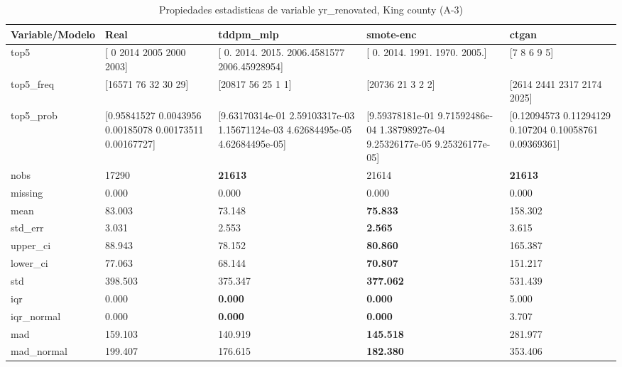 \begin{table}[H]
\centering
\fontsize{8}{14}\selectfont
\caption{Propiedades  estadisticas de variable yr\_renovated, King county (A-3)}
\label{table-stats-king county-a-3-yr_renovated}
\begin{tabular}{|l|m{10em}|m{10em}|m{10em}|m{10em}|}
\hline
 \rowcolor[gray]{0.8}
Variable/Modelo & Real & tddpm\_mlp & smote-enc & ctgan \\
\hline top5 & [   0 2014 2005 2000 2003] & [   0.         2014.         2015.         2006.4581577  2006.45928954] & [   0. 2014. 1991. 1970. 2005.] & [7 8 6 9 5] \\
\hline top5\_freq & [16571    76    32    30    29] & [20817    56    25     1     1] & [20736    21     3     2     2] & [2614 2441 2317 2174 2025] \\
\hline top5\_prob & [0.95841527 0.0043956  0.00185078 0.00173511 0.00167727] & [9.63170314e-01 2.59103317e-03 1.15671124e-03 4.62684495e-05
 4.62684495e-05] & [9.59378181e-01 9.71592486e-04 1.38798927e-04 9.25326177e-05
 9.25326177e-05] & [0.12094573 0.11294129 0.107204   0.10058761 0.09369361] \\
\hline nobs & 17290 & \bfseries 21613 & \cellcolor[rgb]{0.9, 0.54, 0.52} 21614 & \bfseries 21613 \\
\hline missing & 0.000 & 0.000 & 0.000 & 0.000 \\
\hline mean & 83.003 & 73.148 & \bfseries 75.833 & \cellcolor[rgb]{0.9, 0.54, 0.52} 158.302 \\
\hline std\_err & 3.031 & 2.553 & \bfseries 2.565 & \cellcolor[rgb]{0.9, 0.54, 0.52} 3.615 \\
\hline upper\_ci & 88.943 & 78.152 & \bfseries 80.860 & \cellcolor[rgb]{0.9, 0.54, 0.52} 165.387 \\
\hline lower\_ci & 77.063 & 68.144 & \bfseries 70.807 & \cellcolor[rgb]{0.9, 0.54, 0.52} 151.217 \\
\hline std & 398.503 & 375.347 & \bfseries 377.062 & \cellcolor[rgb]{0.9, 0.54, 0.52} 531.439 \\
\hline iqr & 0.000 & \bfseries 0.000 & \bfseries 0.000 & \cellcolor[rgb]{0.9, 0.54, 0.52} 5.000 \\
\hline iqr\_normal & 0.000 & \bfseries 0.000 & \bfseries 0.000 & \cellcolor[rgb]{0.9, 0.54, 0.52} 3.707 \\
\hline mad & 159.103 & 140.919 & \bfseries 145.518 & \cellcolor[rgb]{0.9, 0.54, 0.52} 281.977 \\
\hline mad\_normal & 199.407 & 176.615 & \bfseries 182.380 & \cellcolor[rgb]{0.9, 0.54, 0.52} 353.406 \\

\end{tabular}
\end{table}
